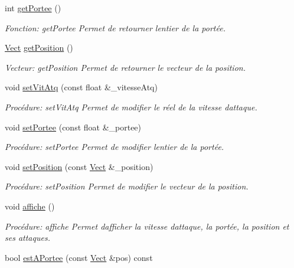 \begin{DoxyCompactItemize}
int \hyperlink{classTour_a4c0b40ef85678f12cc7a3e78588094e8}{get\+Portee} ()
\begin{DoxyCompactList}\small\item\em Fonction\+: get\+Portee Permet de retourner l\textquotesingle{}entier de la portée. \end{DoxyCompactList}\item 
\hyperlink{classVect}{Vect} \hyperlink{classTour_a2283f61d6b088bf41c53c882f4a72864}{get\+Position} ()
\begin{DoxyCompactList}\small\item\em Vecteur\+: get\+Position Permet de retourner le vecteur de la position. \end{DoxyCompactList}\item 
void \hyperlink{classTour_a110c73fc4160189cdafbb700f3999a39}{set\+Vit\+Atq} (const float \&\+\_\+vitesse\+Atq)
\begin{DoxyCompactList}\small\item\em Procédure\+: set\+Vit\+Atq Permet de modifier le réel de la vitesse d\textquotesingle{}attaque. \end{DoxyCompactList}\item 
void \hyperlink{classTour_a7f9a17a8138ebd8afe72520d7d8a18db}{set\+Portee} (const float \&\+\_\+portee)
\begin{DoxyCompactList}\small\item\em Procédure\+: set\+Portee Permet de modifier l\textquotesingle{}entier de la portée. \end{DoxyCompactList}\item 
void \hyperlink{classTour_a1db07b7ed15a7b0d11e96bb67831feba}{set\+Position} (const \hyperlink{classVect}{Vect} \&\+\_\+position)
\begin{DoxyCompactList}\small\item\em Procédure\+: set\+Position Permet de modifier le vecteur de la position. \end{DoxyCompactList}\item 
void \hyperlink{classTour_a418908de2fcbb83e8e9459a999f98aa6}{affiche} ()
\begin{DoxyCompactList}\small\item\em Procédure\+: affiche Permet d\textquotesingle{}afficher la vitesse d\textquotesingle{}attaque, la portée, la position et ses attaques. \end{DoxyCompactList}\item 
bool \hyperlink{classTour_ad9f4d42370374f373f48f7d0fb36559a}{est\+A\+Portee} (const \hyperlink{classVect}{Vect} \&pos) const

\end{DoxyCompactItemize}
